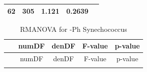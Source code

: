 \documentclass[]{article}
\begin{document}
\begin{longtable}[]{@{}ccccc@{}}
\begin{minipage}[t]{0.10\columnwidth}
62\strut
\end{minipage} & \begin{minipage}[t]{0.10\columnwidth}\centering\strut
305\strut
\end{minipage} & \begin{minipage}[t]{0.12\columnwidth}\centering\strut
1.121\strut
\end{minipage} & \begin{minipage}[t]{0.12\columnwidth}\centering\strut
0.2639\strut
\end{minipage}\tabularnewline
\bottomrule
\end{longtable}

\begin{longtable}[]{@{}ccccc@{}}
\caption{RMANOVA for -Ph Synechococcus}\tabularnewline
\toprule
\begin{minipage}[b]{0.21\columnwidth}\centering\strut
~\strut
\end{minipage} & \begin{minipage}[b]{0.10\columnwidth}\centering\strut
numDF\strut
\end{minipage} & \begin{minipage}[b]{0.10\columnwidth}\centering\strut
denDF\strut
\end{minipage} & \begin{minipage}[b]{0.12\columnwidth}\centering\strut
F-value\strut
\end{minipage} & \begin{minipage}[b]{0.12\columnwidth}\centering\strut
p-value\strut
\end{minipage}\tabularnewline
\midrule
\endfirsthead
\toprule
\begin{minipage}[b]{0.21\columnwidth}\centering\strut
~\strut
\end{minipage} & \begin{minipage}[b]{0.10\columnwidth}\centering\strut
numDF\strut
\end{minipage} & \begin{minipage}[b]{0.10\columnwidth}\centering\strut
denDF\strut
\end{minipage} & \begin{minipage}[b]{0.12\columnwidth}\centering\strut
F-value\strut
\end{minipage} & \begin{minipage}[b]{0.12\columnwidth}\centering\strut
p-value\strut
\end{minipage}\tabularnewline
\midrule
\endhead
\begin{minipage}[t]{0.21\columnwidth}\centering\strut

\end{minipage}
\end{longtable}
\end{document}
